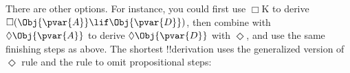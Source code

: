 \documentclass[../../../include/open-logic-section]{subfiles}
\begin{document}
\begin{prob}
\begin{ans}
        There are other options. For instance, you could first use
        $\Box$K to derive $\Box(\Obj{\pvar{A}}\lif\Obj{\pvar{D}})$,
        then combine with $\Diamond \Obj{\pvar{A}}$ to derive
        $\Diamond \Obj{\pvar{D}}$ with $\Diamond$, and use the
        same finishing steps as above. The shortest !!{derivation}
        uses the generalized version of $\Diamond$ rule and the
         rule to omit propositional steps: 

        {\footnotesize
        \def\defaultHypSeparation{\hskip .02in}
        \begin{prooftree}
        \end{prooftree}
        }
    
    \end{ans}
\end{prob}
\end{document}
